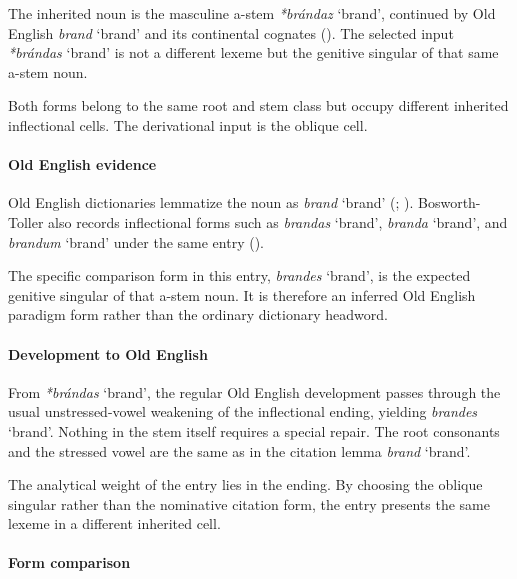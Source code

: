 \documentclass[
  british,
  a4paper,
]{article}
\providecommand{\Recon}[1]{\emph{*#1}}
\begin{document}
The inherited noun is the masculine a-stem \Recon{brándaz} `brand',
continued by Old English {\emph{brand}} `brand' and its continental
cognates (). The selected input
\Recon{brándas} `brand' is not a different lexeme but the genitive
singular of that same a-stem noun.

Both forms belong to the same root and stem class but occupy different
inherited inflectional cells. The derivational input is the oblique
cell.

\paragraph{Old English evidence}\label{old-english-evidence-83}

Old English dictionaries lemmatize the noun as {\emph{brand}} `brand'
(;
).
Bosworth-Toller also records inflectional forms such as {\emph{brandas}}
`brand', {\emph{branda}} `brand', and {\emph{brandum}} `brand' under the
same entry ().

The specific comparison form in this entry, {\emph{brandes}} `brand', is
the expected genitive singular of that a-stem noun. It is therefore an
inferred Old English paradigm form rather than the ordinary dictionary
headword.

\paragraph{Development to Old
English}\label{development-to-old-english-83}

From \Recon{brándas} `brand', the regular Old English development passes
through the usual unstressed-vowel weakening of the inflectional ending,
yielding {\emph{brandes}} `brand'. Nothing in the stem itself requires a
special repair. The root consonants and the stressed vowel are the same
as in the citation lemma {\emph{brand}} `brand'.

The analytical weight of the entry lies in the ending. By choosing the
oblique singular rather than the nominative citation form, the entry
presents the same lexeme in a different inherited cell.

\paragraph{Form comparison}\label{form-comparison-4}
\end{document}
